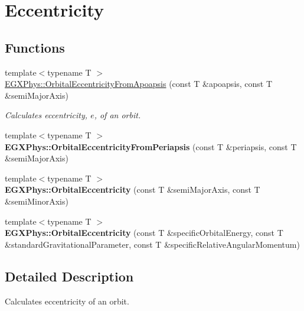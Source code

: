 \hypertarget{group___e_g_x_phys-_eccentricity}{}\section{Eccentricity}
\label{group___e_g_x_phys-_eccentricity}
\subsection*{Functions}
\begin{DoxyCompactItemize}
\item 
{\footnotesize template$<$typename T $>$ }\\\hyperlink{group___e_g_x_phys-_eccentricity_gad0a4e49f20aeb01bd7d4c6b6171f7732}{E\+G\+X\+Phys\+::\+Orbital\+Eccentricity\+From\+Apoapsis} (const T \&apoapsis, const T \&semi\+Major\+Axis)
\begin{DoxyCompactList}\small\item\em Calculates eccentricity, $e$, of an orbit. \end{DoxyCompactList}\item 
\mbox{\label{group___e_g_x_phys-_eccentricity_gab7ac8f2a73c0719282af3b1b5ef21c33}} 
{\footnotesize template$<$typename T $>$ }\\{\bfseries E\+G\+X\+Phys\+::\+Orbital\+Eccentricity\+From\+Periapsis} (const T \&periapsis, const T \&semi\+Major\+Axis)
\item 
\mbox{\label{group___e_g_x_phys-_eccentricity_ga3daa9333997e570655a2c9a798633fc1}} 
{\footnotesize template$<$typename T $>$ }\\{\bfseries E\+G\+X\+Phys\+::\+Orbital\+Eccentricity} (const T \&semi\+Major\+Axis, const T \&semi\+Minor\+Axis)
\item 
\mbox{\label{group___e_g_x_phys-_eccentricity_ga8e98f895819e4fb56ce6bc99b4dfd5a1}} 
{\footnotesize template$<$typename T $>$ }\\{\bfseries E\+G\+X\+Phys\+::\+Orbital\+Eccentricity} (const T \&specific\+Orbital\+Energy, const T \&standard\+Gravitational\+Parameter, const T \&specific\+Relative\+Angular\+Momentum)
\end{DoxyCompactItemize}


\subsection{Detailed Description}
Calculates eccentricity of an orbit. 

